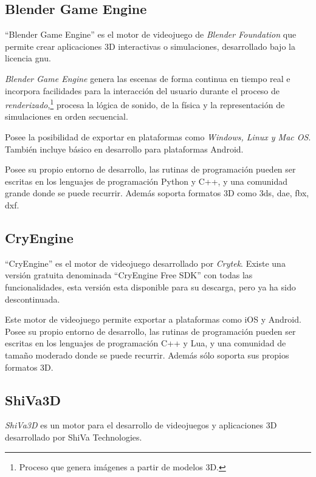\subsection{Blender Game Engine}

\enquote{Blender Game Engine} es el motor de videojuego de \textit{Blender Foundation} 
que permite crear aplicaciones 3D interactivas o simulaciones, desarrollado bajo 
la licencia \Gls{gnu}\cite{blender}.

\textit{Blender Game Engine} genera las escenas de forma continua en tiempo real
e incorpora facilidades para la interacción del usuario durante el proceso de
\textit{renderizado},\footnote{Proceso que genera imágenes a partir de modelos 3D.} procesa la lógica de sonido, de la física y la 
representación de simulaciones en orden secuencial\cite{blender}.

Posee la posibilidad de exportar en plataformas como
\textit{Windows, Linux y Mac OS}. También incluye básico en desarrollo para 
plataformas Android\cite{blender}.

Posee su propio entorno de desarrollo, las rutinas de programación pueden ser 
escritas en los lenguajes de programación Python y C++, y
una comunidad grande donde se puede recurrir. Además soporta formatos 3D 
como 3ds, dae, fbx, dxf\cite{blender}.

\subsection{CryEngine}

\enquote{CryEngine} es el motor de videojuego desarrollado por \textit{Crytek}.
Existe una versión gratuita denominada \enquote{CryEngine Free SDK} con todas
las funcionalidades, esta versión esta disponible para su descarga, pero ya ha
sido descontinuada\cite{cryengine:sdk}.

Este motor de videojuego permite exportar a plataformas como iOS y
Android\cite{cryengine}. Posee su propio entorno de desarrollo, las rutinas de
programación pueden ser escritas en los lenguajes de programación C++ y Lua, y
una comunidad de tamaño moderado donde se puede recurrir. Además sólo soporta
sus propios formatos 3D\cite{cryengine}.

\subsection{ShiVa3D}

\textit{ShiVa3D} es un motor para el desarrollo de videojuegos y aplicaciones 
3D desarrollado por ShiVa Technologies\cite{shiva}.

